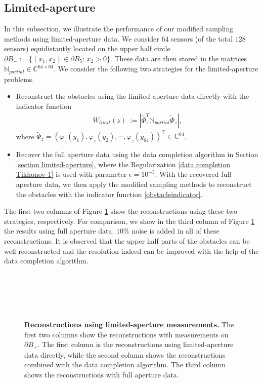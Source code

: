 \documentclass[final]{siamltex}
\newcommand{\C}{{\mathbb C}}
\newcommand{\ben}{\begin{eqnarray*}}
\newcommand{\enn}{\end{eqnarray*}}
\newcommand{\pa}{\partial}
\begin{document}
\subsection{Limited-aperture}
In this subsection, we illustrate the performance of our modified sampling methods using limited-aperture data. We consider $64$ sensors (of the total $128$ sensors)  equidistantly located on the upper half circle $\pa B_{+}:=\{(x_1,x_2)\in \pa B_5: \, x_2>0\}$.
These data are then stored in the matrices $\mathbb{N}_{partial} \in \C^{64 \times 64}$.
We consider the following two strategies for the limited-aperture problems.
\begin{itemize}
  \item Reconstruct the obstacles using the limited-aperture data directly with the indicator function
  \ben
W_{limit}(z)\ :=|\widetilde{\Phi}_z^{T}\mathbb{N}_{partial}\widetilde{\Phi}_z|,
\enn
where $\widetilde{\Phi}_z=(\varphi_z(y_1), \varphi_z(y_2),\cdots, \varphi_z(y_{64}))^\top \in \C^{64}$.
  \item Recover the full aperture data using the data completion algorithm in Section \ref{section limited-aperture}, where the Regularization \eqref{data completion Tikhonov 1} is used with parameter $\epsilon = 10^{-3}$. With the recovered full aperture data, we then apply the modified sampling methods to reconstruct the obstacles with the indicator function \eqref{obstacleindicator}.
\end{itemize}

The first two columns of Figure \ref{limitaperture} show the reconstructions using these two strategies, respectively. For comparison, we show in the third column of   Figure \ref{limitaperture} the results using full aperture data. $10\%$ noise is added in all of these reconstructions.
It is observed that the upper half parts of the obstacles can be well reconstructed and the resolution indeed can be improved with the help of the data completion algorithm.

\begin{figure}[htbp]
  \centering
{}\\
  \\
  \\
      \\
\caption{ {\bf Reconstructions using limited-aperture measurements.} The first two columns show the reconstructions with measurements on  $\pa B_+$.
The first column is the reconstructions using limited-aperture data directly, while the second column shows the reconstructions combined with the data completion algorithm. The third column shows the reconstructions with full aperture data.}
\label{limitaperture}
\end{figure}
\end{document}
